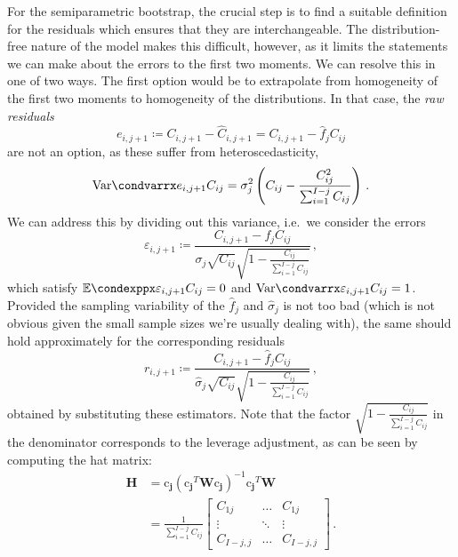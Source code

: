 \documentclass[a4paper]{book}
\begin{document}
For the semiparametric bootstrap, the crucial step is to find a suitable definition for the residuals which ensures that they are interchangeable. The distribution-free nature of the model makes this difficult, however, as it limits the statements we can make about the errors to the first two moments. We can resolve this in one of two ways. The first option would be to extrapolate from homogeneity of the first two moments to homogeneity of the distributions. In that case, the \emph{raw residuals}
\begin{equation}
  e_{i, j + 1} \coloneqq C_{i, j + 1} - \widehat{C}_{i, j + 1} = C_{i, j + 1} - \widehat{f}_j C_{ij}
\end{equation}
are not an option, as these suffer from heteroscedasticity,
\begin{equation}
  \condvarr{e_{i, j + 1}}{C_{ij}} = \sigma^2_j \left( C_{ij} - \frac{C^2_{ij}}{\sum_{i = 1}^{I - j} C_{ij}} \right) \,.
\end{equation}
We can address this by dividing out this variance, i.e.\ we consider the errors
\begin{equation}
  \varepsilon_{i, j + 1} \coloneqq \frac{C_{i, j + 1} - f_j C_{ij}}{\sigma_j \sqrt{C_{ij}} \sqrt{1 - \frac{C_{ij}}{\sum_{i = 1}^{I - j} C_{ij}}}} \,,
\end{equation}
which satisfy $\condexpp{\varepsilon_{i, j + 1}}{C_{ij}} = 0$ and $\condvarr{\varepsilon_{i, j + 1}}{C_{ij}} = 1$. Provided the sampling variability of the $\widehat{f}_j$ and $\widehat{\sigma}_j$ is not too bad (which is not obvious given the small sample sizes we're usually dealing with), the same should hold approximately for the corresponding residuals
\begin{equation}
  r_{i, j + 1} \coloneqq \frac{C_{i, j + 1} - \widehat{f}_j C_{ij}}{\widehat{\sigma}_j \sqrt{C_{ij}} \sqrt{1 - \frac{C_{ij}}{\sum_{i = 1}^{I - j} C_{ij}}}} \,,
\end{equation}
obtained by substituting these estimators. Note that the factor $\sqrt{1 - \frac{C_{ij}}{\sum_{i = 1}^{I - j} C_{ij}}}$ in the denominator corresponds to the leverage adjustment, as can be seen by computing the hat matrix:
\begin{align}
  \mathbf{H} & = \bm{\mathrm{c}_j} (\bm{\mathrm{c}_j}^T \mathbf{W} \bm{\mathrm{c}_j})^{-1} \bm{\mathrm{c}_j}^T \mathbf{W} \\[4pt]
             & = \frac{1}{\sum_{i = 1}^{I - j} C_{ij}}
  \begin{bmatrix}
    C_{1j}       & \dots  & C_{1j}       \\
    \vdots       & \ddots & \vdots       \\
    C_{I - j, j} & \dots  & C_{I - j, j}
  \end{bmatrix} \,.
\end{align}
\end{document}
